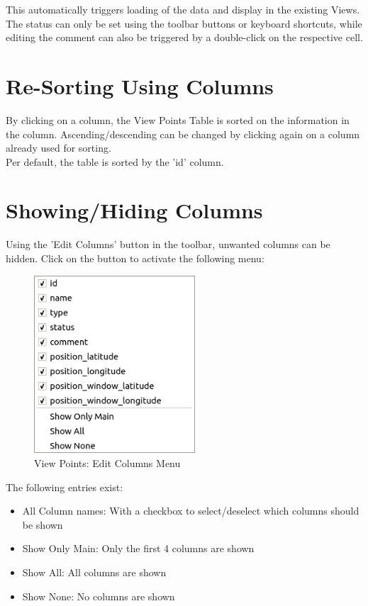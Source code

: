 This automatically triggers loading of the data and display in the existing Views. \\

The status can only be set using the toolbar buttons or keyboard shortcuts, while editing the comment can also be triggered by a double-click on the respective cell.

\section{Re-Sorting Using Columns}

By clicking on a column, the View Points Table is sorted on the information in the column. Ascending/descending can be changed by clicking again on a column already used for sorting. \\

Per default, the table is sorted by the 'id' column.

\section{Showing/Hiding Columns}

Using the 'Edit Columns' button in the toolbar, unwanted columns can be hidden. Click on the button to activate the following menu:

\begin{figure}[H]
  \centering 
    \includegraphics[width=6cm,frame]{figures/view_points_edit_columns.png}
  \caption{View Points: Edit Columns Menu}
\end{figure}

The following entries exist:

\begin{itemize}  
\item All Column names: With a checkbox to select/deselect which columns should be shown
\item Show Only Main: Only the first 4 columns are shown
\item Show All: All columns are shown
\item Show None: No columns are shown
\end{itemize}
\ \\

